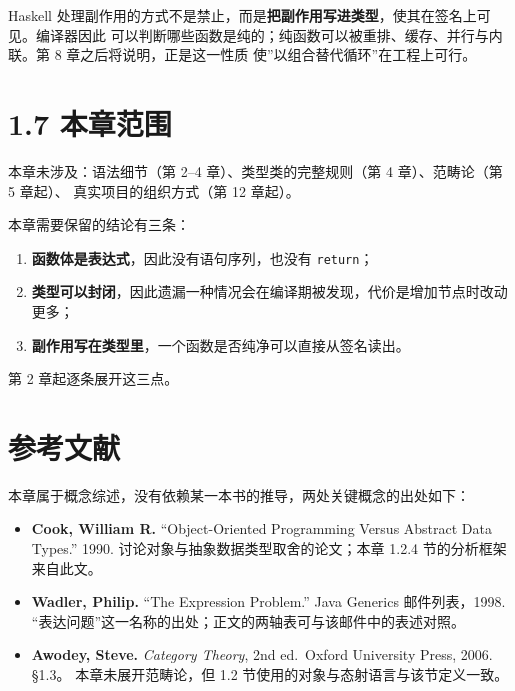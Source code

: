 Haskell 处理副作用的方式不是禁止，而是\textbf{把副作用写进类型}，使其在签名上可见。编译器因此
可以判断哪些函数是纯的；纯函数可以被重排、缓存、并行与内联。第 8 章之后将说明，正是这一性质
使''以组合替代循环''在工程上可行。

\section{1.7 本章范围}\label{ux672cux7ae0ux8303ux56f4}

本章未涉及：语法细节（第 2--4 章）、类型类的完整规则（第 4 章）、范畴论（第 5 章起）、
真实项目的组织方式（第 12 章起）。

本章需要保留的结论有三条：

\begin{enumerate}
\def\labelenumi{\arabic{enumi}.}
\tightlist
\item
  \textbf{函数体是表达式}，因此没有语句序列，也没有 \passthrough{\lstinline!return!}；
\item
  \textbf{类型可以封闭}，因此遗漏一种情况会在编译期被发现，代价是增加节点时改动更多；
\item
  \textbf{副作用写在类型里}，一个函数是否纯净可以直接从签名读出。
\end{enumerate}

第 2 章起逐条展开这三点。

\section*{参考文献}
\label{ux53c2ux8003ux6587ux732e}

本章属于概念综述，没有依赖某一本书的推导，两处关键概念的出处如下：

\begin{itemize}
\tightlist
\item
  \textbf{Cook, William R.} ``Object-Oriented Programming Versus Abstract Data Types.'' 1990.
  讨论对象与抽象数据类型取舍的论文；本章 1.2.4 节的分析框架来自此文。
\item
  \textbf{Wadler, Philip.} ``The Expression Problem.'' Java Generics 邮件列表，1998.
  ``表达问题''这一名称的出处；正文的两轴表可与该邮件中的表述对照。
\item
  \textbf{Awodey, Steve.} \emph{Category Theory}, 2nd ed.~Oxford University Press, 2006. §1.3。
  本章未展开范畴论，但 1.2 节使用的对象与态射语言与该节定义一致。
\end{itemize}
